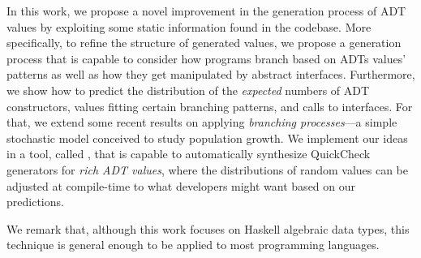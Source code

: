 In this work, we propose a novel improvement in the generation process of ADT
values by exploiting some static information found in the codebase.
%
More specifically, to refine the structure of generated values, we propose a
generation process that is capable to consider how programs branch based on ADTs
values' patterns as well as how they get manipulated by abstract interfaces.
%
Furthermore, we show how to predict the distribution of the \emph{expected}
numbers of ADT constructors, values fitting certain branching patterns, and
calls to interfaces.
%
For that, we extend some recent results on applying \emph{branching
  processes}\cite{gw1875}---a simple stochastic model conceived to study
population growth.
%
We implement our ideas in a tool, called {\dragenp}, that is capable to
automatically synthesize QuickCheck generators for \emph{rich ADT values}, where
the distributions of random values can be adjusted at compile-time to what
developers might want based on our predictions.
%

We remark that, although this work focuses on Haskell algebraic data types, this
technique is general enough to be applied to most programming languages.


